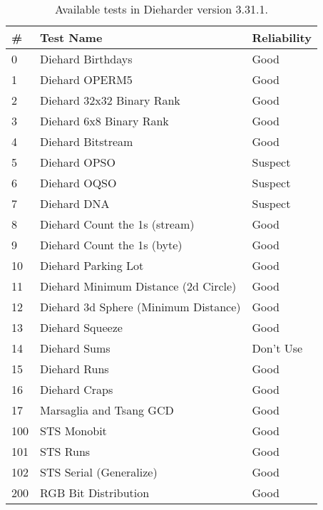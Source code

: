\begin{table}[tb]
  \caption{Available tests in Dieharder version 3.31.1.}
  \label{tab:diehard_tests}
  \begin{center}
    \begin{tabular}{l | l | l}
    \hline
    \hline
    \textbf{\#} & \textbf{Test Name} & \textbf{Reliability} \\
    \hline
0   &                      Diehard Birthdays  &        Good \\
1   &                         Diehard OPERM5  &        Good \\
2   &              Diehard 32x32 Binary Rank  &        Good \\
3   &                Diehard 6x8 Binary Rank  &        Good \\
4   &                      Diehard Bitstream  &        Good \\
5   &                                Diehard OPSO  &     Suspect \\
6   &                           Diehard OQSO  &     Suspect \\
7   &                            Diehard DNA  &     Suspect \\
8   &          Diehard Count the 1s (stream)  &        Good \\
9   &            Diehard Count the 1s (byte)  &        Good \\
10  &                    Diehard Parking Lot  &        Good \\
11  &    Diehard Minimum Distance (2d Circle) &        Good \\
12  &    Diehard 3d Sphere (Minimum Distance) &        Good \\
13  &                        Diehard Squeeze  &        Good \\
14  &                           Diehard Sums  &  Don't Use \\
15  &                           Diehard Runs  &        Good \\
16  &                          Diehard Craps  &        Good \\
17  &                Marsaglia and Tsang GCD  &        Good \\
100 &                            STS Monobit  &        Good \\
101 &                               STS Runs  &        Good \\
102 &               STS Serial (Generalize)  &        Good \\
200 &                   RGB Bit Distribution  &        Good \\

\end{tabular}
\end{center}
\end{table}

